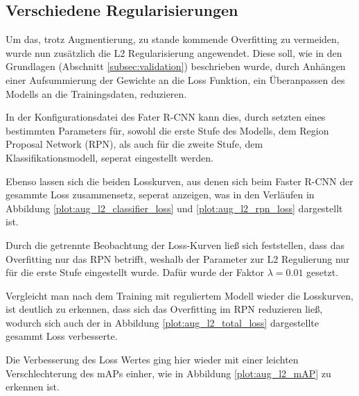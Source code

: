 \subsection{Verschiedene Regularisierungen}

Um das, trotz Augmentierung, zu stande kommende Overfitting zu 
vermeiden, wurde nun zusätzlich die L2 Regularisierung angewendet.
Diese soll, wie in den Grundlagen (Abschnitt \ref{subsec:validation})
beschrieben wurde, durch Anhängen einer Aufsummierung der Gewichte
an die Loss Funktion, ein Überanpassen des Modells an die
Trainingsdaten, reduzieren.

In der Konfigurationsdatei des Fater R-CNN kann dies,
durch setzten eines bestimmten Parameters für, sowohl die
erste Stufe des Modells, dem Region Proposal Network (RPN),
als auch für die zweite Stufe, dem Klassifikationsmodell,
seperat eingestellt werden.

Ebenso lassen sich die beiden Losskurven, aus denen sich 
beim Faster R-CNN der gesammte Loss zusammensetz,
seperat anzeigen, was in den Verläufen in 
Abbildung \ref{plot:aug_l2_classifier_loss}
und \ref{plot:aug_l2_rpn_loss} dargestellt ist.

Durch die getrennte Beobachtung der Loss-Kurven ließ sich 
feststellen, dass das Overfitting nur das RPN betrifft,
weshalb der Parameter zur L2 Regulierung nur 
für die erste Stufe eingestellt wurde.
Dafür wurde der Faktor $\lambda = 0.01$ gesetzt.

Vergleicht man nach dem Training mit 
reguliertem Modell wieder die Losskurven, ist deutlich zu 
erkennen, dass sich das Overfitting im RPN 
reduzieren ließ, wodurch sich auch der
in Abbildung \ref{plot:aug_l2_total_loss} 
dargestellte gesammt Loss verbesserte.

Die Verbesserung des Loss Wertes 
ging hier wieder mit einer leichten 
Verschlechterung des mAPs einher, wie in Abbildung
\ref{plot:aug_l2_mAP} zu erkennen ist.


